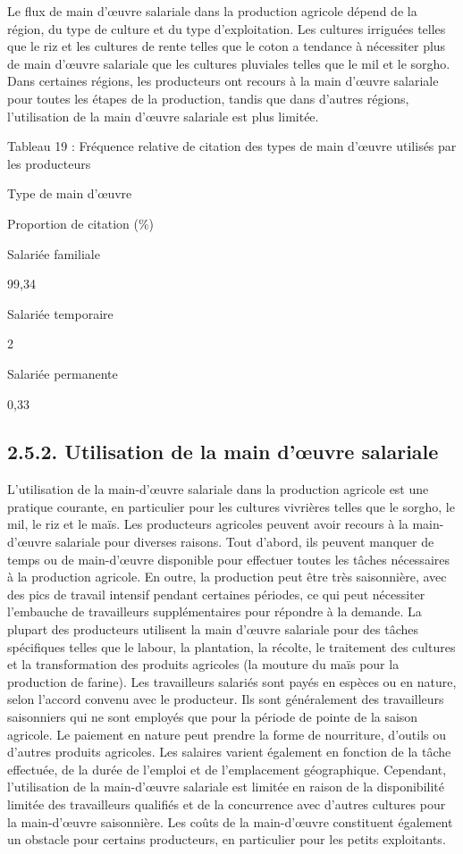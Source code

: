 \documentclass[12pt,oneside]{report}
\begin{document}
Le flux de main d'œuvre salariale dans la production agricole dépend de la région, du type de culture et du type d'exploitation. Les cultures irriguées telles que le riz et les cultures de rente telles que le coton a tendance à nécessiter plus de main d'œuvre salariale que les cultures pluviales telles que le mil et le sorgho. Dans certaines régions, les producteurs ont recours à la main d'œuvre salariale pour toutes les étapes de la production, tandis que dans d'autres régions, l'utilisation de la main d'œuvre salariale est plus limitée.

Tableau 19 : Fréquence relative de citation des types de main d’œuvre utilisés par les producteurs

Type de main d'œuvre

Proportion de citation (\%)

Salariée familiale

99,34

Salariée temporaire

2

Salariée permanente

0,33

\subsection{2.5.2. Utilisation de la main d’œuvre salariale}
L'utilisation de la main-d'œuvre salariale dans la production agricole est une pratique courante, en particulier pour les cultures vivrières telles que le sorgho, le mil, le riz et le maïs. Les producteurs agricoles peuvent avoir recours à la main-d'œuvre salariale pour diverses raisons. Tout d'abord, ils peuvent manquer de temps ou de main-d'œuvre disponible pour effectuer toutes les tâches nécessaires à la production agricole. En outre, la production peut être très saisonnière, avec des pics de travail intensif pendant certaines périodes, ce qui peut nécessiter l'embauche de travailleurs supplémentaires pour répondre à la demande. La plupart des producteurs utilisent la main d'œuvre salariale pour des tâches spécifiques telles que le labour, la plantation, la récolte, le traitement des cultures et la transformation des produits agricoles (la mouture du maïs pour la production de farine). Les travailleurs salariés sont payés en espèces ou en nature, selon l'accord convenu avec le producteur. Ils sont généralement des travailleurs saisonniers qui ne sont employés que pour la période de pointe de la saison agricole. Le paiement en nature peut prendre la forme de nourriture, d'outils ou d'autres produits agricoles. Les salaires varient également en fonction de la tâche effectuée, de la durée de l'emploi et de l'emplacement géographique. Cependant, l'utilisation de la main-d'œuvre salariale est limitée en raison de la disponibilité limitée des travailleurs qualifiés et de la concurrence avec d'autres cultures pour la main-d'œuvre saisonnière. Les coûts de la main-d'œuvre constituent également un obstacle pour certains producteurs, en particulier pour les petits exploitants.
\end{document}
